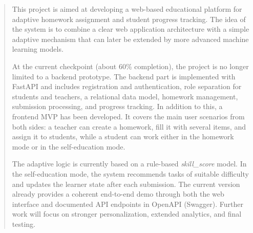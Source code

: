 \documentclass[a4paper,12pt]{extarticle}
\begin{document}

\newpage

\tableofcontents
\newpage



\begin{abstract}
This project is aimed at developing a web-based educational platform for adaptive homework assignment and student progress tracking. The idea of the system is to combine a clear web application architecture with a simple adaptive mechanism that can later be extended by more advanced machine learning models.

At the current checkpoint (about 60\% completion), the project is no longer limited to a backend prototype. The backend part is implemented with FastAPI and includes registration and authentication, role separation for students and teachers, a relational data model, homework management, submission processing, and progress tracking. In addition to this, a frontend MVP has been developed. It covers the main user scenarios from both sides: a teacher can create a homework, fill it with several items, and assign it to students, while a student can work either in the homework mode or in the self-education mode.

The adaptive logic is currently based on a rule-based \textit{skill\_score} model. In the self-education mode, the system recommends tasks of suitable difficulty and updates the learner state after each submission. The current version already provides a coherent end-to-end demo through both the web interface and documented API endpoints in OpenAPI (Swagger). Further work will focus on stronger personalization, extended analytics, and final testing.
\end{abstract}
  
\end{document}
